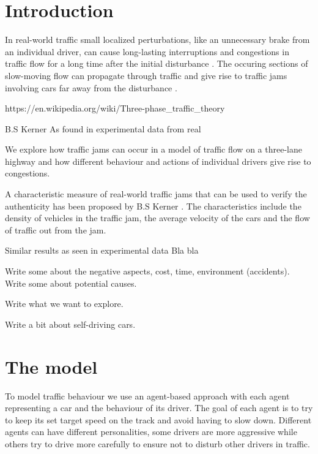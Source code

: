 \documentclass[12pt,a4paper]{article}
\begin{document}
\section{Introduction}
In real-world traffic small localized perturbations, like an unnecessary brake from an individual driver, can cause long-lasting interruptions and congestions in traffic flow for a long time after the initial disturbance \cite{kerner97flow}. The occuring sections of slow-moving flow can propagate through traffic and give rise to traffic jams involving cars far away from the disturbance \cite{kerner96trafficjam}.

https://en.wikipedia.org/wiki/Three-phase\_traffic\_theory

B.S Kerner As found in experimental data from real 

We explore how traffic jams can occur in a model of traffic flow on a three-lane highway and how different behaviour and actions of individual drivers give rise to congestions.

A characteristic measure of real-world traffic jams that can be used to verify the authenticity has been proposed by B.S Kerner \cite{kerner96trafficjam}. The characteristics include the density of vehicles in the traffic jam, the average velocity of the cars and the flow of traffic out from the jam.

Similar results as seen in experimental data
Bla bla

Write some about the negative aspects, cost, time, environment (accidents). Write some about potential causes.

Write what we want to explore.

Write a bit about self-driving cars.



\section{The model}
To model traffic behaviour we use an agent-based approach with each agent representing a car and the behaviour of its driver. The goal of each agent is to try to keep its set target speed on the track and avoid having to slow down. Different agents can have different personalities, some drivers are more aggressive while others try to drive more carefully to ensure not to disturb other drivers in traffic.
\end{document}
